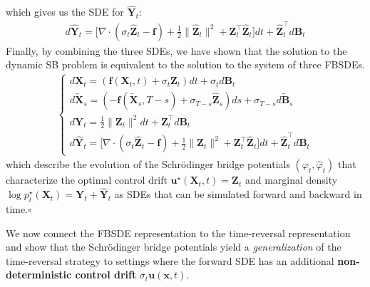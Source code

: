\documentclass{article}
\begin{document}
which gives us the SDE for $\widehat{\boldsymbol{Y}}_t$:
\begin{align}
    \boxed{d\widehat{\boldsymbol{Y}}_t=\bigg[\nabla\cdot (\sigma_t\widehat{\boldsymbol{Z}}_t-\boldsymbol{f})+\frac{1}{2}\|\widehat{\boldsymbol{Z}}_t\|^2+ \boldsymbol{Z}_t^\top \widehat{\boldsymbol{Z}}_t\bigg]dt+\widehat{\boldsymbol{Z}}_t^\top d \boldsymbol{B}_t}
\end{align}
Finally, by combining the three SDEs, we have shown that the solution to the dynamic SB problem is equivalent to the solution to the system of three FBSDEs.
\begin{align}
    \boxed{\begin{cases}
        d\boldsymbol{X}_t=\left(\boldsymbol{f}(\boldsymbol{X}_t,t)+ \sigma_t \boldsymbol{Z}_t\right)dt+\sigma_t d\boldsymbol{B}_t\\
        d\tilde{\boldsymbol{X}}_s=(-\boldsymbol{f}(\tilde{\boldsymbol{X}}_s,T-s)+\sigma_{T-s}\widehat{\boldsymbol{Z}}_s)ds+\sigma_{T-s}d\tilde{\boldsymbol{B}}_s\\
        d\boldsymbol{Y}_t=\frac{1}{2}\|\boldsymbol{Z}_t\|^2dt+\boldsymbol{Z}_t^\top d \boldsymbol{B}_t\\
        d\widehat{\boldsymbol{Y}}_t=\big[\nabla\cdot (\sigma_t\widehat{\boldsymbol{Z}}_t-\boldsymbol{f})+\frac{1}{2}\|\widehat{\boldsymbol{Z}}_t\|^2+ \boldsymbol{Z}_t^\top \widehat{\boldsymbol{Z}}_t\big]dt+\widehat{\boldsymbol{Z}}_t^\top d \boldsymbol{B}_t
    \end{cases}}\tag{Forward-Backward SDEs}
\end{align}
which describe the evolution of the Schrödinger bridge potentials $(\varphi_t,\hat\varphi_t)$ that characterize the optimal control drift $\boldsymbol{u}^\star(\boldsymbol{X}_t,t)=\boldsymbol{Z}_t$ and marginal density $\log p^\star_t(\boldsymbol{X}_t)=\boldsymbol{Y}_t+\widehat{\boldsymbol{Y}}_t$ as SDEs that can be simulated forward and backward in time.\hfill $\square$

We now connect the FBSDE representation to the time-reversal representation and show that the Schrödinger bridge potentials yield a \textit{generalization} of the time-reversal strategy to settings where the forward SDE has an additional \textbf{non-deterministic control drift} $\sigma_t\boldsymbol{u}(\boldsymbol{x},t)$.
\end{document}
